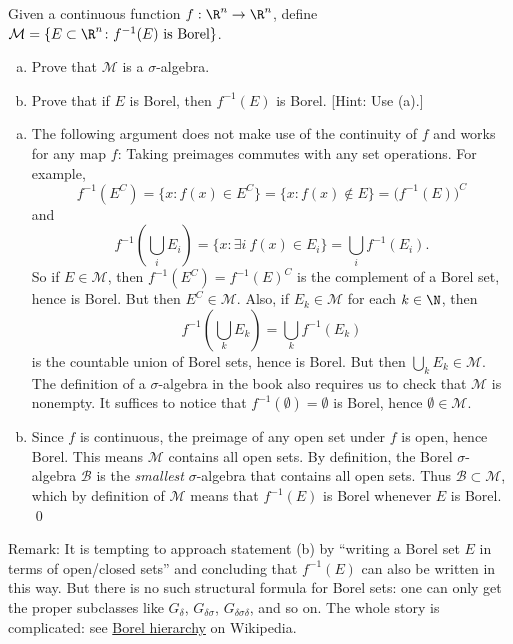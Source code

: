 \begin{hwsol}
Given a continuous function $f:  \R^n \to \R^n$, define $\mathcal{M}= \{ E \subset \R^n \colon f^{-1}(E) \text{ is Borel} \}$. 
	\begin{enumerate}[(a)]
	\item Prove that $\mathcal{M}$ is a $\sigma$-algebra.
	\item Prove that if $E$ is Borel, then $f^{-1}(E)$ is Borel. [Hint: Use (a).] \\
	\end{enumerate}

\pf \hfill
\begin{enumerate}[(a)]
\item The following argument does not make use of the continuity of $f$ and works for any map $f$: Taking preimages commutes with any set operations. For example, 
	\[
	f^{-1}(E^C)= \{ x \colon f(x) \in E^C \}= \{ x \colon f(x) \notin E \} = \big( f^{-1}(E) \big)^C
	\]
and 
	\[
	f^{-1} \left( \bigcup_i E_i \right)= \{ x \colon \exists i \ f(x) \in E_i \}= \bigcup_i f^{-1}(E_i).
	\]
So if $E\in \mathcal{M}$, then $f^{-1}(E^C) = f^{-1}(E)^C$ is the complement of a Borel set, hence is Borel. But then $E^C  \in \mathcal{M}$. Also, if $E_k \in \mathcal{M}$ for each $k \in \N$, then 
	\[
	f^{-1} \left( \bigcup_k E_k \right)=  \bigcup_k f^{-1}(E_k) 
	\]
is the countable union of Borel sets, hence is Borel. But then $\bigcup_k E_k \in \mathcal{M}$. The definition of a $\sigma$-algebra in the book also requires us to check that $\mathcal{M}$ is nonempty. It suffices to notice that $f^{-1}(\emptyset)= \emptyset$ is Borel, hence $\emptyset \in \mathcal{M}$.

\item Since $f$ is continuous, the preimage of any open set under $f$ is open, hence Borel. This means $\mathcal M$ contains all open sets. By definition, the Borel $\sigma$-algebra $\mathcal B$ is the \emph{smallest} $\sigma$-algebra that contains all open sets. Thus $\mathcal B\subset \mathcal M$, which by definition of $\mathcal M$ means that $f^{-1}(E)$ is Borel whenever $E$ is Borel. \qed \\
\end{enumerate}

\noindent Remark: It is tempting to approach statement (b) by ``writing a Borel set $E$ in terms of open/closed sets'' and concluding that $f^{-1}(E)$ can also be written in this way. But there is no such structural formula for Borel sets: one can only get the proper subclasses like $G_\delta$, $G_{\delta\sigma}$, $G_{\delta\sigma\delta}$, and so on. The whole story is complicated: see  \href{https://en.wikipedia.org/wiki/Borel_hierarchy}{Borel hierarchy} on Wikipedia. \\
\end{hwsol}


